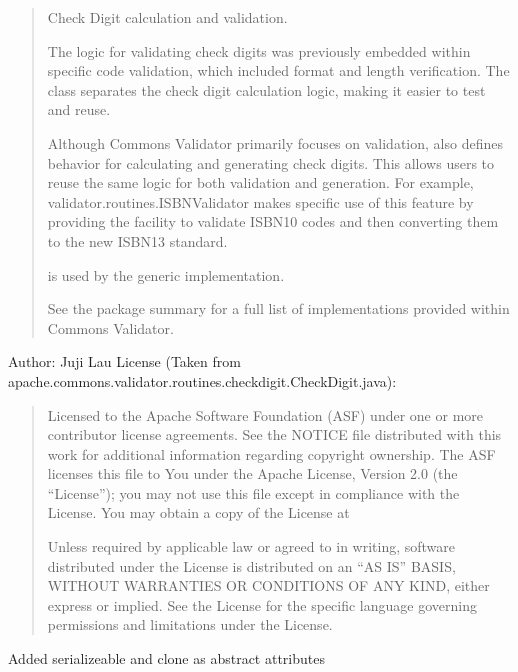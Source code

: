 \documentclass[letterpaper,10pt,english]{sphinxmanual}
\begin{document}
\begin{quote}

\sphinxAtStartPar
Check Digit calculation and validation.

\sphinxAtStartPar
The logic for validating check digits was previously embedded within specific
code validation, which included format and length verification. The 
class separates the check digit calculation logic, making it easier to test and reuse.

\sphinxAtStartPar
Although Commons Validator primarily focuses on validation,  also defines
behavior for calculating and generating check digits. This allows users to reuse the same
logic for both validation and generation. For example, validator.routines.ISBNValidator
makes specific use of this feature by providing the facility to validate
ISBN\sphinxhyphen{}10 codes and then converting them to the new ISBN\sphinxhyphen{}13 standard.

\sphinxAtStartPar
{} is used by the generic  implementation.
\begin{description}
\sphinxAtStartPar
See the package summary for a full list of implementations provided within Commons Validator.

\end{description}
\end{quote}

\sphinxAtStartPar
Author: Juji Lau
License (Taken from apache.commons.validator.routines.checkdigit.CheckDigit.java):
\begin{quote}

\sphinxAtStartPar
Licensed to the Apache Software Foundation (ASF) under one or more
contributor license agreements. See the NOTICE file distributed with
this work for additional information regarding copyright ownership.
The ASF licenses this file to You under the Apache License, Version 2.0
(the “License”); you may not use this file except in compliance with
the License. You may obtain a copy of the License at
\begin{quote}

\sphinxAtStartPar
{}
\end{quote}

\sphinxAtStartPar
Unless required by applicable law or agreed to in writing, software
distributed under the License is distributed on an “AS IS” BASIS,
WITHOUT WARRANTIES OR CONDITIONS OF ANY KIND, either express or implied.
See the License for the specific language governing permissions and
limitations under the License.
\end{quote}
\begin{description}
\sphinxAtStartPar
Added serializeable and clone as abstract attributes

\end{description}
\end{document}
